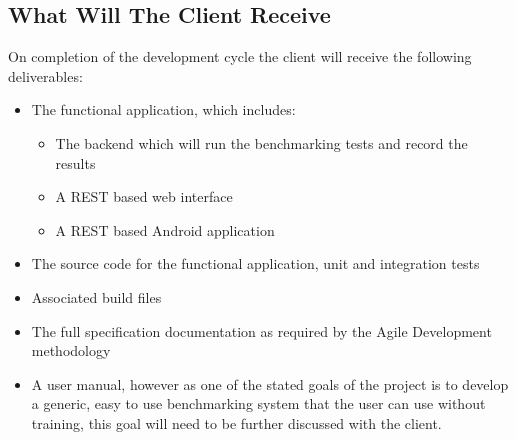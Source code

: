 \subsection{What Will The Client Receive}
On completion of the development cycle the client will receive the following deliverables:
\begin{itemize}
	\item The functional application, which includes:
	\begin{itemize}
		\item The backend which will run the benchmarking tests and record the results
		\item A REST based web interface
		\item A REST based Android application
	\end{itemize}
	\item The source code for the functional application, unit and integration tests
	\item Associated build files
	\item The full specification documentation as required by the Agile Development methodology
	\item A user manual, however as one of the stated goals of the project is to develop a generic, easy to use benchmarking system that the user can use without training, this goal will need to be further discussed with the client.
\end{itemize}
